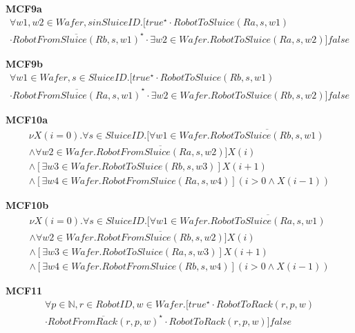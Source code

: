 \documentclass[12pt]{report}
\begin{document}
    \textbf{MCF9a}
    \begin{multline*}
        \forall w1,w2 \in \mathit{Wafer}, s in SluiceID.[true^{\star} \cdot RobotToSluice(Ra,s,w1) \\
        \cdot \overline{RobotFromSluice(Rb,s,w1)}^{\star} \cdot  \exists w2 \in \mathit{Wafer}. RobotToSluice(Ra,s,w2)]false
    \end{multline*}

    \textbf{MCF9b}
    \begin{multline*}
        \forall w1 \in \mathit{Wafer}, s \in SluiceID.[true^{\star} \cdot RobotToSluice(Rb,s,w1)\\
        \cdot \overline{RobotFromSluice(Ra,s,w1)}^{\star} \cdot  \exists w2 \in \mathit{Wafer}. RobotToSluice(Rb,s,w2)]false
    \end{multline*}

    \textbf{MCF10a}
    \begin{multline*}
        \nu X(i=0). \forall s \in SluiceID. [\forall w1 \in \mathit{Wafer}. \overline{RobotToSluice(Rb,s,w1)} \\
        \wedge \forall w2 \in \mathit{Wafer}. \overline{RobotFromSluice(Ra,s,w2)}] X(i) \\
        \wedge [\exists w3 \in \mathit{Wafer}. RobotToSluice(Rb,s,w3)]X(i+1) \\
        \wedge [\exists w4 \in \mathit{Wafer}.RobotFromSluice(Ra,s,w4)](i>0 \wedge X(i-1))
    \end{multline*}

    \textbf{MCF10b}
    \begin{multline*}
        \nu X(i=0). \forall s \in SluiceID. [\forall w1 \in \mathit{Wafer}. \overline{RobotToSluice(Ra,s,w1)} \\
        \wedge \forall w2 \in \mathit{Wafer}. \overline{RobotFromSluice(Rb,s,w2)}] X(i) \\
        \wedge [\exists w3 \in \mathit{Wafer}. RobotToSluice(Ra,s,w3)]X(i+1) \\
        \wedge [\exists w4 \in \mathit{Wafer}.RobotFromSluice(Rb,s,w4)](i>0 \wedge X(i-1))
    \end{multline*}

    \textbf{MCF11}
    \begin{multline*}
        \forall p \in \mathbb{N}, r \in RobotID, w \in \mathit{Wafer}. [true^{\star} \cdot RobotToRack(r,p,w)\\
         \cdot \overline{RobotFromRack(r,p,w)}^{\star} \cdot RobotToRack(r,p,w)]false
    \end{multline*}
\end{document}

